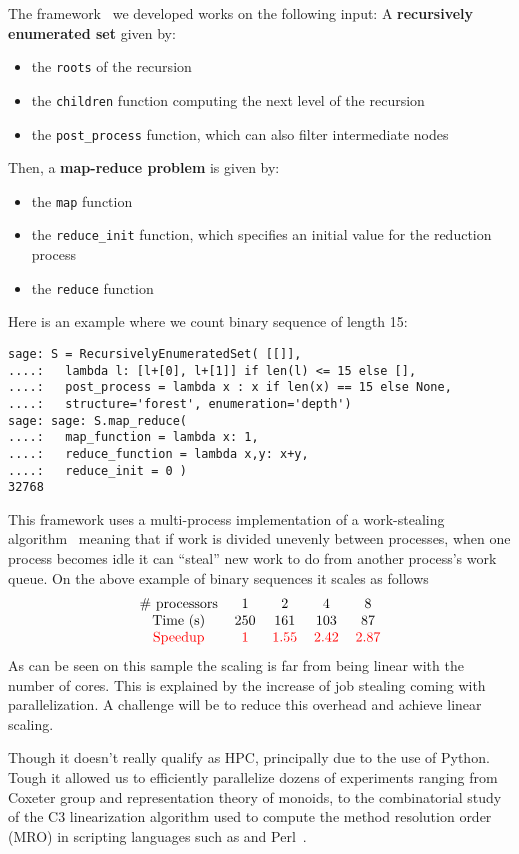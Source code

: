 \documentclass{deliverablereport}
\begin{document}
The framework~\cite{map-reduce} we developed works on the following input:
A \textbf{recursively enumerated set} given by:
\begin{itemize}
\item the \texttt{roots} of the recursion
\item the \texttt{children} function computing the next level of the recursion
\item the \texttt{post\_process} function, which can also filter intermediate nodes
\end{itemize}
Then, a \textbf{map-reduce problem} is given by:
\begin{itemize}
\item the \texttt{map} function
\item the \verb|reduce_init| function, which specifies an initial value for
    the reduction process
\item the \texttt{reduce} function
\end{itemize}
Here is an example where we count binary sequence of length 15:
\begin{verbatim}
sage: S = RecursivelyEnumeratedSet( [[]],
....:   lambda l: [l+[0], l+[1]] if len(l) <= 15 else [],
....:   post_process = lambda x : x if len(x) == 15 else None,
....:   structure='forest', enumeration='depth') 
sage: sage: S.map_reduce(
....:   map_function = lambda x: 1,
....:   reduce_function = lambda x,y: x+y,
....:   reduce_init = 0 )
32768
\end{verbatim}
This framework uses a multi-process implementation of a work-stealing
algorithm~\cite{BlumofeL99, BlumofeL99} meaning that if work is divided
unevenly between processes, when one process becomes idle it can ``steal'' new
work to do from another process's work queue. On the above example of binary
sequences it scales as follows
\[\begin{tabular}{ccccc}
\# processors & 1 & 2 & 4 & 8 \\
Time (s) & 250 & 161  & 103  & 87 \\
\textcolor{red}{Speedup}
 & \textcolor{red}{1}
 & \textcolor{red}{1.55}
 & \textcolor{red}{2.42}
 & \textcolor{red}{2.87}
\end{tabular}
\]
As can be seen on this sample the scaling is far from
being linear with the number of cores. This is explained by the increase
of job stealing coming with parallelization. A challenge will be to reduce
this overhead and achieve linear scaling.

Though it doesn't really qualify as HPC, principally due to the use of Python.
Tough it allowed us to efficiently parallelize dozens of experiments ranging from
Coxeter group and representation theory of monoids, to the combinatorial study
of the C3 linearization algorithm used to compute the method resolution order
(MRO) in scripting languages such as \Python and Perl~\cite{C3-controled}.
\end{document}
